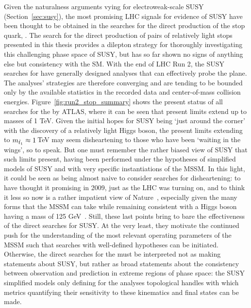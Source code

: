 Given the naturalness arguments vying for electroweak-scale SUSY (Section~\ref{sec:susy}),
the most promising LHC signals for evidence of SUSY have been thought to be obtained in the searches for the direct production
of the stop quark, \stopone.
The search for the direct production of pairs of relatively light stops presented in this thesis provides a dilepton
strategy for thoroughly investigating this challenging phase space of SUSY, but has so far shown no signs of anything else
but consistency with the SM.
With the end of LHC Run 2, the SUSY searches for \stopone have generally designed analyses that can effectively
probe the \msn plane.
The analyses' strategies are therefore converging and are tending to be bounded only by the available statistics
in the recorded data and center-of-mass collision energies.
Figure~\ref{fig:run2_stop_summary} shows the present status of all searches for the \stopone by ATLAS,
where it can be seen that present limits extend up to \stopone masses of 1 TeV.
Given the initial hopes for SUSY being `just around the corner' with the discovery of a relatively light Higgs boson,
the present limits extending to $m_{\tilde{t}_1} \approx 1$\,TeV may seem disheartening to those who
have been `waiting in the wings', so to speak.
But one must remember the rather biased view of SUSY that such limits present, having been performed
under the hypotheses of simplified models of SUSY and with very specific instantiations of the MSSM.
In this light, it could be seen as being almost naive to consider searches for \stopone disheartening:
to have thought it promising in 2009, just as the LHC was turning on, and to think it less so now
is a rather impatient view of Nature~\cite{FengNaturalness}, especially given the many forms that the MSSM
can take while remaining consistent with a Higgs boson having a mass of 125 GeV~\cite{SUSYPrimer}.
Still, these last points bring to bare the effectiveness of the direct searches for SUSY.
At the very least, they motivate the continued push for the understanding of the most relevant
operating parameters of the MSSM such that searches with well-defined hypotheses can
be initiated.
Otherwise, the direct searches for the \stopone must be interpreted not as making statements
about SUSY, but rather as broad statements about the consistency between observation and prediction in extreme regions of phase space:
the SUSY simplified models only defining for the analyses topological handles with which metrics
quantifying their sensitivity to these kinematics and final states can be made.

